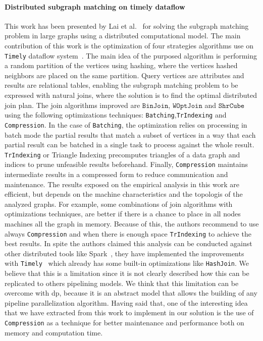 \paragraph{Distributed subgraph matching on timely dataflow} This work has been presented by Lai et al.~\cite{Lai} for solving the subgraph matching problem in large graphs using a distributed computational model.
The main contribution of this work is the optimization of four strategies algorithms use on \texttt{Timely} dataflow system~\cite{timelyflow}. 
The main idea of the purposed algorithm is performing a random partition of the vertices using hashing, where the vertices hashed neighbors are placed on the same partition.
Query vertices are attributes and results are relational tables, enabling the subgraph matching problem to be expressed with natural joins, where the solution is to find the optimal distributed join plan.
The join algorithms improved are $\mathtt{BinJoin}$, $\mathtt{WOptJoin}$ and $\mathtt{ShrCube}$ using the following optimizations techniques: \texttt{Batching},\texttt{TrIndexing} and \texttt{Compression}.
In the case of \texttt{Batching}, the optimization relies on processing in batch mode the partial results that match a subset of vertices in a way that each partial result can be batched in a single task to process against the whole result.
\texttt{TrIndexing} or Triangle Indexing precomputes triangles of a data graph and indices to prune unfeasible results beforehand. Finally, \texttt{Compression} maintains intermediate results in a compressed form to reduce communication and maintenance. 
The results exposed on the empirical analysis in this work are efficient, but depends on the machine characteristics and the topologis of the analyzed graphs. 
For example, some combinations of join algorithms with optimizations techniques, are better if there is a chance to place in all nodes machines all the graph in memory. Because of this, the authors recommend to use always \texttt{Compression} and when there is enough space \texttt{TrIndexing} to achieve the best results. 
In spite the authors claimed this analysis can be conducted against other distributed tools like Spark~\cite{apachespark}, they have implemented the improvements with \texttt{Timely}~\cite{timelyflow} which already has some built-in optimizations like \texttt{HashJoin}.
We believe that this is a limitation since it is not clearly described how this can be replicated to others pipelining models.
We think that this limitation can be overcome with \acrshort{dp}, because it is an abstract model that allows the building of any pipeline parallelization algorithm.
Having said that, one of the interesting idea that we have extracted from this work to implement in our solution is the use of \texttt{Compression} as a technique for better maintenance and performance both on memory and computation time.

